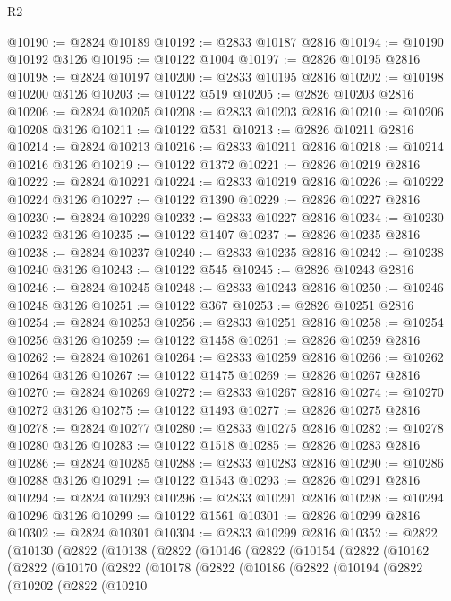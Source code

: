 \begin{lexlean}{R2}
\begin{coremodule}
@10190 := @2824 @10189
@10192 := @2833 @10187 @2816
@10194 := @10190 @10192 @3126
@10195 := @10122 @1004
@10197 := @2826 @10195 @2816
@10198 := @2824 @10197
@10200 := @2833 @10195 @2816
@10202 := @10198 @10200 @3126
@10203 := @10122 @519
@10205 := @2826 @10203 @2816
@10206 := @2824 @10205
@10208 := @2833 @10203 @2816
@10210 := @10206 @10208 @3126
@10211 := @10122 @531
@10213 := @2826 @10211 @2816
@10214 := @2824 @10213
@10216 := @2833 @10211 @2816
@10218 := @10214 @10216 @3126
@10219 := @10122 @1372
@10221 := @2826 @10219 @2816
@10222 := @2824 @10221
@10224 := @2833 @10219 @2816
@10226 := @10222 @10224 @3126
@10227 := @10122 @1390
@10229 := @2826 @10227 @2816
@10230 := @2824 @10229
@10232 := @2833 @10227 @2816
@10234 := @10230 @10232 @3126
@10235 := @10122 @1407
@10237 := @2826 @10235 @2816
@10238 := @2824 @10237
@10240 := @2833 @10235 @2816
@10242 := @10238 @10240 @3126
@10243 := @10122 @545
@10245 := @2826 @10243 @2816
@10246 := @2824 @10245
@10248 := @2833 @10243 @2816
@10250 := @10246 @10248 @3126
@10251 := @10122 @367
@10253 := @2826 @10251 @2816
@10254 := @2824 @10253
@10256 := @2833 @10251 @2816
@10258 := @10254 @10256 @3126
@10259 := @10122 @1458
@10261 := @2826 @10259 @2816
@10262 := @2824 @10261
@10264 := @2833 @10259 @2816
@10266 := @10262 @10264 @3126
@10267 := @10122 @1475
@10269 := @2826 @10267 @2816
@10270 := @2824 @10269
@10272 := @2833 @10267 @2816
@10274 := @10270 @10272 @3126
@10275 := @10122 @1493
@10277 := @2826 @10275 @2816
@10278 := @2824 @10277
@10280 := @2833 @10275 @2816
@10282 := @10278 @10280 @3126
@10283 := @10122 @1518
@10285 := @2826 @10283 @2816
@10286 := @2824 @10285
@10288 := @2833 @10283 @2816
@10290 := @10286 @10288 @3126
@10291 := @10122 @1543
@10293 := @2826 @10291 @2816
@10294 := @2824 @10293
@10296 := @2833 @10291 @2816
@10298 := @10294 @10296 @3126
@10299 := @10122 @1561
@10301 := @2826 @10299 @2816
@10302 := @2824 @10301
@10304 := @2833 @10299 @2816
@10352 := @2822
    (@10130
      (@2822
        (@10138
          (@2822
            (@10146
              (@2822
                (@10154
                  (@2822
                    (@10162
                      (@2822
                        (@10170
                          (@2822
                            (@10178
                              (@2822
                                (@10186
                                  (@2822
                                    (@10194
                                      (@2822
                                        (@10202
                                          (@2822
                                            (@10210

\end{coremodule}
\end{lexlean}
